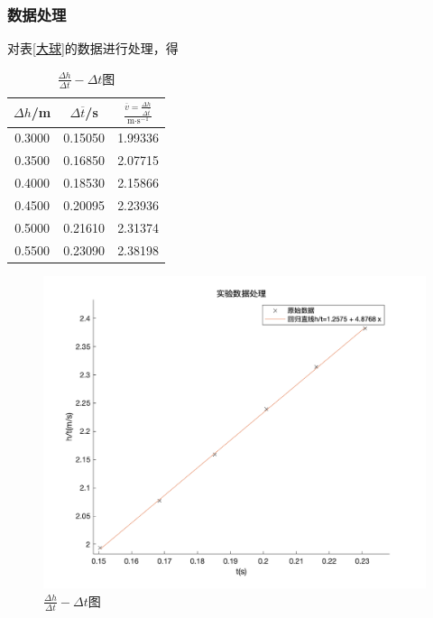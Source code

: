 \documentclass[a4paper]{article}%
\begin{document}
\subsubsection{数据处理}
对表\ref{大球}的数据进行处理，得
\begin{table}[H]
    \begin{minipage}{0.4\linewidth}
        \centering
        \begin{tabular}{ccc}
            \toprule
            $\Delta h$/m & $\Delta\overline{t}$/s & $\frac{\overline{v}=\frac{\Delta h}{\Delta\overline{t}}}{\text{m·s}^{-1}}$ \\
            \midrule
            0.3000 & 0.15050 & 1.99336 \\
            0.3500 & 0.16850 & 2.07715 \\
            0.4000 & 0.18530 & 2.15866 \\
            0.4500 & 0.20095 & 2.23936 \\
            0.5000 & 0.21610 & 2.31374 \\
            0.5500 & 0.23090 & 2.38198 \\
            \bottomrule
        \end{tabular}
        \caption{处理后数据}
    \end{minipage}
    \begin{minipage}{0.6\linewidth}
        \centering
        \begin{figure}[H]
            \includegraphics[scale=0.25]{p3.png}
            \caption{$\frac{\Delta h}{\Delta t}-\Delta t$图}\label{图}
        \end{figure}
    \end{minipage}
\end{table}
\end{document}
